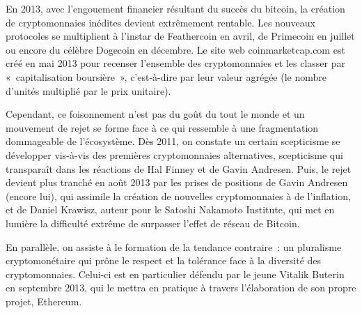 
En 2013, avec l'engouement financier résultant du succès du bitcoin, la création de cryptomonnaies inédites devient extrêmement rentable. Les nouveaux protocoles se multiplient à l'instar de Feathercoin en avril, de Primecoin en juillet ou encore du célèbre Dogecoin en décembre. Le site web coinmarketcap.com est créé en mai 2013 pour recenser l'ensemble des cryptomonnaies et les classer par «~capitalisation boursière~», c'est-à-dire par leur valeur agrégée (le nombre d'unités multiplié par le prix unitaire).

Cependant, ce foisonnement n'est pas du goût du tout le monde et un mouvement de rejet se forme face à ce qui ressemble à une fragmentation dommageable de l'écosystème. Dès 2011, on constate un certain scepticisme se développer vis-à-vis des premières cryptomonnaies alternatives, scepticisme qui transparaît dans les réactions de Hal Finney et de Gavin Andresen. Puis, le rejet devient plus tranché en août 2013 par les prises de positions de Gavin Andresen (encore lui), qui assimile la création de nouvelles cryptomonnaies à de l'inflation, et de Daniel Krawisz, auteur pour le Satoshi Nakamoto Institute, qui met en lumière la difficulté extrême de surpasser l'effet de réseau de Bitcoin.

En parallèle, on assiste à le formation de la tendance contraire~: un pluralisme cryptomonétaire qui prône le respect et la tolérance face à la diversité des cryptomonnaies. Celui-ci est en particulier défendu par le jeune Vitalik Buterin en septembre 2013, qui le mettra en pratique à travers l'élaboration de son propre projet, Ethereum.

